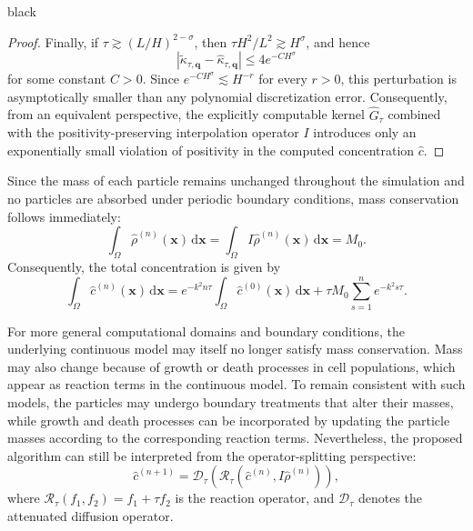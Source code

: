 \documentclass[review,onefignum,onetabnum]{siamart250211}
\begin{document}
\begin{color}{black}
\begin{proof}
Finally, if
$\tau\gtrsim(L/H)^{2-\sigma}$, then
$\tau H^2/L^2\gtrsim H^\sigma$, and hence
\begin{equation}
\left|
\widetilde{\kappa}_{\tau,\mathbf q}
-
\hat{\kappa}_{\tau,\mathbf q}
\right|
\leq
4e^{-CH^\sigma}
\end{equation}
for some constant $C>0$. Since $e^{-CH^\sigma} \lesssim H^{-r}$ for every
$r>0$, this perturbation is asymptotically smaller than any polynomial
discretization error. Consequently, from an equivalent perspective, the explicitly computable kernel $\widehat{G}_{\tau}$ combined with the positivity-preserving interpolation operator $I$ introduces only an exponentially small violation of positivity in the computed concentration $\hat{c}$.
\end{proof}
Since the mass of each particle remains unchanged throughout the simulation and no particles are absorbed under periodic boundary conditions, mass conservation follows immediately:
\begin{equation}
\int_{\Omega}\hat{\rho}^{(n)}(\mathbf{x})\,\mathrm{d}\mathbf{x}
=
\int_{\Omega}I\hat{\rho}^{(n)}(\mathbf{x})\,\mathrm{d}\mathbf{x}
=
M_0.
\end{equation}
Consequently, the total concentration is given by
\begin{equation}
\int_{\Omega}\hat{c}^{(n)}(\mathbf{x})\,\mathrm{d}\mathbf{x}
=
e^{-k^2n\tau}
\int_{\Omega}\hat{c}^{(0)}(\mathbf{x})\,\mathrm{d}\mathbf{x}
+
\tau M_0
\sum_{s=1}^{n}
e^{-k^2s\tau}.
\end{equation}

For more general computational domains and boundary conditions, the underlying continuous model may itself no longer satisfy mass conservation. Mass may also change because of growth or death processes in cell populations, which appear as reaction terms in the continuous model. To remain consistent with such models, the particles may undergo boundary treatments that alter their masses, while growth and death processes can be incorporated by updating the particle masses according to the corresponding reaction terms. Nevertheless, the proposed algorithm can still be interpreted from the operator-splitting perspective:
\begin{equation}
\hat{c}^{(n+1)}
=
\mathcal{D}_{\tau}
\!\left(
\mathcal{R}_{\tau}
\!\left(
\hat{c}^{(n)},
I\hat{\rho}^{(n)}
\right)
\right),
\end{equation}
where
$\mathcal{R}_{\tau}(f_1,f_2)=f_1+\tau f_2$
is the reaction operator, and
$\mathcal{D}_{\tau}$ denotes the attenuated diffusion operator.


\end{color}
\end{document}
